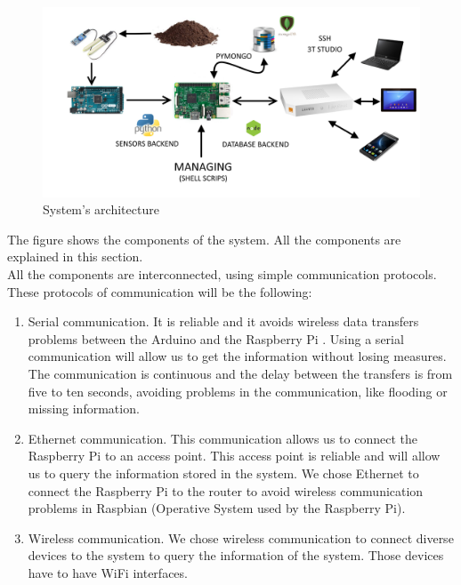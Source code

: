 \begin{figure}[H]
\begin{centering}
\includegraphics[scale=0.15]{IMGS/SYSTEM_SCHEMA.png}
\caption{System's architecture \label{System's architecture}}
\end{centering}
\end{figure}

The figure shows the components of the system. All the components are explained in this section.\\

All the components are interconnected, using simple communication protocols. These protocols of communication will be the following:

\begin{enumerate}

\item Serial communication. It is reliable and it avoids wireless data transfers problems between the Arduino and the Raspberry Pi \cite{what_is_raspberry_pi, raspberry_pi}. Using a serial communication will allow us to get the information without losing measures. The communication is continuous and the delay between the transfers is from five to ten seconds, avoiding problems in the communication, like flooding or missing information.

\item Ethernet communication. This communication allows us to connect the Raspberry Pi to an access point. This access point is reliable and will allow us to query the information stored in the system. We chose Ethernet to connect the Raspberry Pi to the router to avoid wireless communication problems in Raspbian \cite{raspbian} (Operative System used by the Raspberry Pi).

\item Wireless communication. We chose wireless communication to connect diverse devices to the system to query the information of the system. Those devices have to have WiFi interfaces.

\end{enumerate}

